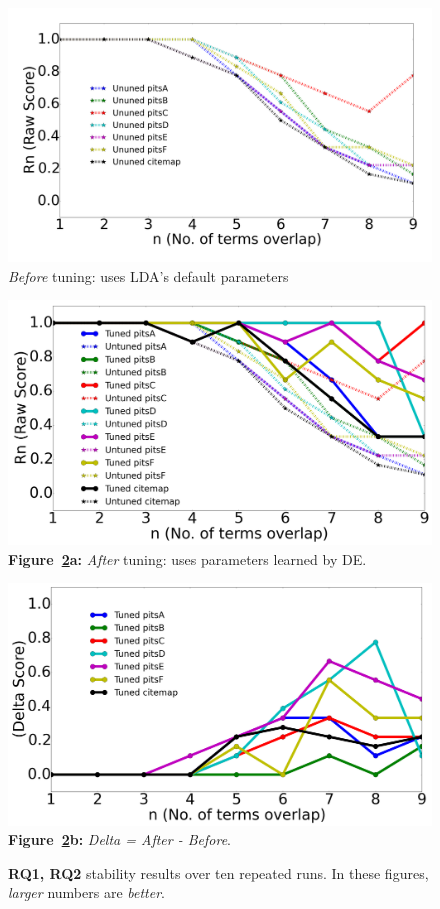 \documentclass[twocolumn,5p,sort&compress]{elsarticle}
\theoremstyle{break}
\begin{document}
 
\begin{figure}[!b]
  \begin{center}
    \includegraphics[width=\linewidth]{./fig/Vem_untuned.png}
    \end{center}
  \caption{{\em Before} tuning: uses LDA's default parameters}\label{fig:delta11}  
\end{figure}
\begin{figure}[!t]
        \begin{center}
        \includegraphics[width=0.9\linewidth]{./fig/raw_graph.png}
  \footnotesize{{\bf Figure~\ref{fig:delta}a:}  {\em After} tuning: uses parameters learned by DE.}

        \includegraphics[width=0.9\linewidth]{./fig/tuned_delta_vem.png}
  \footnotesize{{\bf Figure~\ref{fig:delta}b:}  {\em Delta = After - Before}.}
  \end{center}
    \caption{{\bf RQ1, RQ2} stability results over ten repeated runs. In these figures, {\em larger} numbers
    are {\em better}.}\label{fig:delta}
\end{figure}
\end{document}
